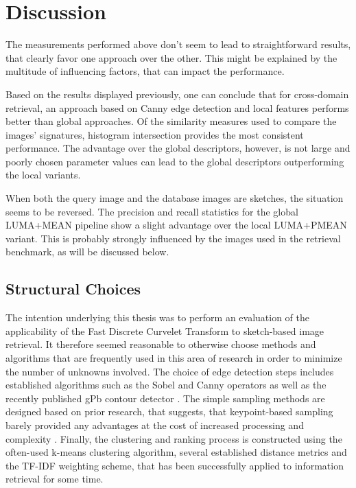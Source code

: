 \chapter{Discussion}\label{ch:discussion}

The measurements performed above don't seem to lead to straightforward results,
that clearly favor one approach over the other. This might be explained by the
multitude of influencing factors, that can impact the performance.

Based on the results displayed previously, one can conclude that for
cross-domain retrieval, an approach based on Canny edge detection and local
features performs better than global approaches. Of the similarity measures
used to compare the images' signatures, histogram intersection provides the
most consistent performance. 
The advantage over the global descriptors, however, is not large and poorly
chosen parameter values can lead to the global descriptors outperforming the
local variants.

When both the query image and the database images are sketches, the situation
seems to be reversed. The precision and recall statistics for the global
LUMA+MEAN pipeline show a slight advantage over the local LUMA+PMEAN variant.
This is probably strongly influenced by the images used in the retrieval
benchmark, as will be discussed below.

\section{Structural Choices}

The intention underlying this thesis was to perform an evaluation of the
applicability of the Fast Discrete Curvelet Transform to sketch-based image
retrieval. It therefore seemed reasonable to otherwise choose methods and
algorithms that are frequently used in this area of research in order to
minimize the number of unknowns involved. The choice of edge detection steps
includes established algorithms such as the Sobel and Canny operators as well
as the recently published gPb contour detector
\autocite{arbelaez_contour_2011}. The simple sampling methods are designed
based on prior research, that suggests, that keypoint-based sampling barely
provided any advantages at the cost of increased processing and complexity
\autocite{nowak_sampling_2006}. Finally, the clustering and ranking process is
constructed using the often-used k-means clustering algorithm, several
established distance metrics and the TF-IDF weighting scheme, that has been
successfully applied to information retrieval for some time.

